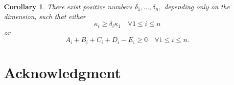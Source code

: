 \documentclass{amsart}
\newtheorem{corollary}[theorem]{Corollary}
\theoremstyle{definition}
\theoremstyle{remark}
\numberwithin{equation}{section}
\begin{document}
\begin{corollary}\label{Alternative}
There exist positive numbers $\delta_1,\dots,\delta_n,$ depending only on the dimension, such that either
\begin{equation}
\kappa_i\geq \delta_i\kappa_1\quad\forall 1\leq i\leq n
\end{equation}
or
\begin{equation}
A_i+B_i+C_i+D_i-E_i\geq 0\quad\forall 1\leq i\leq n.
\end{equation}
\end{corollary}

\section*{Acknowledgment}


\end{document}
